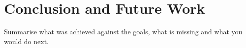\section{Conclusion and Future Work}

Summarise what was achieved against the goals, what is missing and what you would do next.
